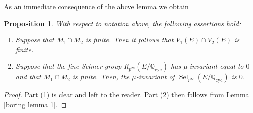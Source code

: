 \documentclass[12pt]{amsart}
\newtheorem{proposition}[theorem]{Proposition}
\newcommand{\Q}{\mathbb{Q}}
\newcommand{\op}[1]{\operatorname{#1}}
\numberwithin{equation}{section}
\begin{document}
As an immediate consequence of the above lemma we obtain
\begin{proposition}\label{Propn on M1 and M2}
\label{prop}
    With respect to notation above, the following assertions hold:
    \begin{enumerate}
        \item Suppose that $M_1\cap M_2$ is finite. Then it follows that $V_1(E)\cap V_2(E)$ is finite.
        \item Suppose that the fine Selmer group $R_{p^\infty}(E/\Q_{\op{cyc}})$ has $\mu$-invariant equal to $0$ and that $M_1\cap M_2$ is finite. Then, the $\mu$-invariant of $\op{Sel}_{p^\infty}(E/\Q_{\op{cyc}})$ is $0$.
    \end{enumerate}
\end{proposition}
\begin{proof}
    Part (1) is clear and left to the reader. Part (2) then follows from Lemma \ref{boring lemma 1}.
\end{proof}
\end{document}
